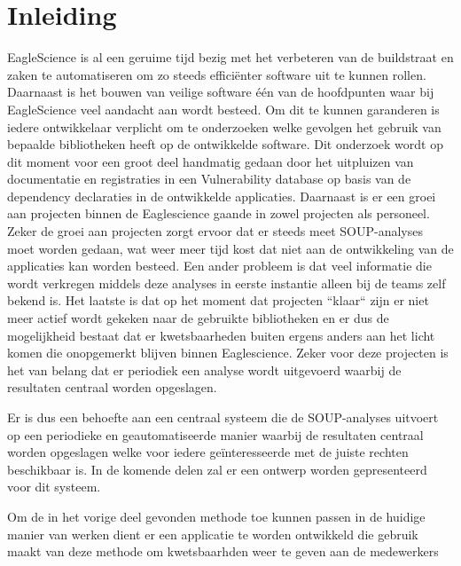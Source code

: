 \chapter{Inleiding}\label{ch:impl-inleiding}
EagleScience is al een geruime tijd bezig met het verbeteren van de buildstraat en zaken te automatiseren om zo steeds efficiënter software uit te kunnen rollen. Daarnaast is het bouwen van veilige software één van de hoofdpunten waar bij EagleScience veel aandacht aan wordt besteed. Om dit te kunnen garanderen is iedere ontwikkelaar verplicht om te onderzoeken welke gevolgen het gebruik van bepaalde bibliotheken heeft op de ontwikkelde software. Dit onderzoek wordt op dit moment voor een groot deel handmatig gedaan door het uitpluizen van documentatie en registraties in een Vulnerability database op basis van de dependency declaraties in de ontwikkelde applicaties. Daarnaast is er een groei aan projecten binnen de Eaglescience gaande in zowel projecten als personeel. Zeker de groei aan projecten zorgt ervoor dat er steeds meet SOUP-analyses moet worden gedaan, wat weer meer tijd kost dat niet aan de ontwikkeling van de applicaties kan worden besteed. Een ander probleem is dat veel informatie die wordt verkregen middels deze analyses in eerste instantie alleen bij de teams zelf bekend is. Het laatste is dat op het moment dat projecten ``klaar`` zijn er niet meer actief wordt gekeken naar de gebruikte bibliotheken en er dus de mogelijkheid bestaat dat er kwetsbaarheden buiten ergens anders aan het licht komen die onopgemerkt blijven binnen Eaglescience. Zeker voor deze projecten is het van belang dat er periodiek een analyse wordt uitgevoerd waarbij de resultaten centraal worden opgeslagen.

Er is dus een behoefte aan een centraal systeem die de SOUP-analyses uitvoert op een periodieke en geautomatiseerde manier waarbij de resultaten centraal worden opgeslagen welke voor iedere geïnteresseerde met de juiste rechten beschikbaar is. In de komende delen zal er een ontwerp worden gepresenteerd voor dit systeem.






Om de in het vorige deel gevonden methode toe kunnen passen in de huidige manier van werken dient er een applicatie te worden ontwikkeld die gebruik maakt van deze methode om kwetsbaarhden weer te geven aan de medewerkers
